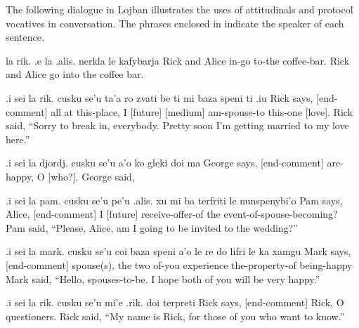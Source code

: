 The following dialogue in Lojban illustrates the uses of
    attitudinals and protocol vocatives in conversation. The
    phrases enclosed in  indicate the speaker of
    each sentence.
\begin{example}
la rik. .e la .alis. nerkla le kafybarja\n
Rick and Alice in-go to-the coffee-bar.\n
Rick and Alice go into the coffee bar.
\end{example}

\begin{example}
.i sei la rik. cusku se'u\n
\T	ta'a ro zvati be ti\n
\T	mi baza speni ti .iu\n
{} Rick says, [end-comment]\n
\T	[Interrupt] all at this-place,\n
\T	I [future] [medium] am-spouse-to this-one [love].\n
Rick said, ``Sorry to break in, everybody.\n
\T	Pretty soon I'm getting married\n
\T	to my love here.''
\end{example}

\begin{example}
.i sei la djordj. cusku se'u\n
\T	a'o ko gleki doi ma\n
{} George says, [end-comment]\n
{} are-happy, O [who?].\n
George said, 
\end{example}

\begin{example}
.i sei la pam. cusku se'u\n
\T	pe'u .alis.\n
\T	xu mi ba terfriti\n
\T	le nunspenybi'o\n
{} Pam says,\n
\T	[Please] Alice, [end-comment]\n
\T	[Is it true?] I [future] receive-offer-of\n
\T	the event-of-spouse-becoming?\n
Pam said, ``Please, Alice, am I going to be\n
\T	invited to the wedding?''
\end{example}

\begin{example}
.i sei la mark. cusku se'u\n
\T	coi baza speni\n
\T	a'o le re do lifri\n
\T	le ka xamgu\n
{} Mark says, [end-comment]\n
\T	[Greetings] [future] [medium] spouse(s),\n
\T	[Hope] the two of-you experience\n
\T	the-property-of being-happy\n
Mark said, ``Hello, spouses-to-be.  I hope both of\n
\T	you will be very happy.''
\end{example}

\begin{example}
.i sei la rik. cusku se'u\n
\T	mi'e .rik. doi terpreti\n
{} Rick says, [end-comment]\n
\T	[I am] Rick, O questioners.\n
Rick said, ``My name is Rick, for those of you who\n
\T	want to know.''
\end{example}


